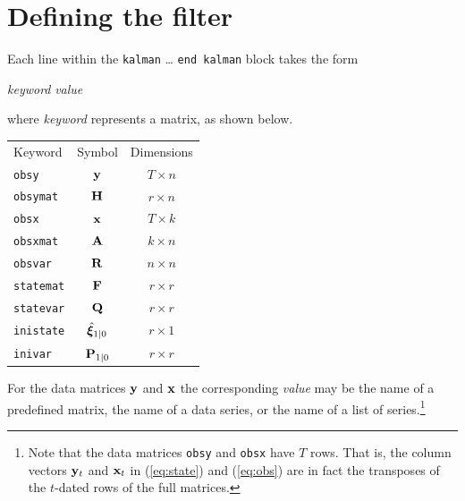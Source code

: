 \documentclass[a4paper]{article}
\newcommand{\obsvec}{\ensuremath\mathbf{y}}
\newcommand{\obsmat}{\ensuremath\mathbf{H}}
\newcommand{\obsx}{\ensuremath\mathbf{x}}
\newcommand{\obsxmat}{\ensuremath\mathbf{A}}
\newcommand{\obsvar}{\ensuremath\mathbf{R}}
\newcommand{\statevec}{\ensuremath\mathbf{\bm \xi}}
\newcommand{\statemat}{\ensuremath\mathbf{F}}
\newcommand{\strvar}{\ensuremath\mathbf{Q}}
\newcommand{\statevar}{\ensuremath\mathbf{P}}
\begin{document}
\section{Defining the filter}

Each line within the \texttt{kalman} \dots{} \texttt{end kalman} block 
takes the form

\vspace{1ex}
\textsl{keyword} \textsl{value}
\vspace{1ex}

\noindent where \textsl{keyword} represents a matrix, as shown 
below.

\begin{center}
\begin{tabular}{lcc}
Keyword & Symbol & Dimensions \\[6pt]
\texttt{obsy}     & $\obsvec$         & $T \times n$ \\
\texttt{obsymat}  & $\obsmat$         & $r \times n$ \\
\texttt{obsx}     & $\obsx$           & $T \times k$ \\
\texttt{obsxmat}  & $\obsxmat$        & $k \times n$ \\ 
\texttt{obsvar}   & $\obsvar$         & $n \times n$ \\
\texttt{statemat} & $\statemat$         & $r \times r$ \\
\texttt{statevar} & $\strvar$         & $r \times r$ \\
\texttt{inistate} & $\hat{\statevec}_{1|0}$  & $r \times 1$ \\
\texttt{inivar}   & $\statevar_{1|0}$ & $r \times r$ \\
\end{tabular}
\end{center}

For the data matrices $\obsvec$ and $\obsx$ the corresponding
\textsl{value} may be the name of a predefined matrix, the name of a
data series, or the name of a list of series.\footnote{Note that the
  data matrices \texttt{obsy} and \texttt{obsx} have $T$ rows.  That
  is, the column vectors $\obsvec_t$ and $\obsx_t$ in (\ref{eq:state})
  and (\ref{eq:obs}) are in fact the transposes of the $t$-dated rows
  of the full matrices.}  
\end{document}
